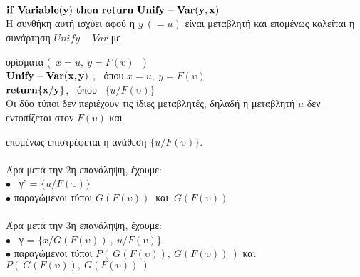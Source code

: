 \documentclass[10pt]{article}
\begin{document}
 \hspace{10mm} $\bf if \ Variable(y) \ then \ return \ Unify-Var(y,x)$\\

\hspace{10mm} Η συνθήκη αυτή ισχύει αφού η $y \ (=u)$ είναι μεταβλητή και επομένως καλείται η συνάρτηση $Unify-Var$ με

\hspace{10mm} ορίσματα (\ $x=u, \  y=F(\text{υ})$ \ ) \\ 

\hspace{10mm} $\bf Unify-Var(x,y)$ , \ όπου  $x = u , \  y = F(\text{υ})$ \\

\hspace{10mm} $ \bf return \{x/y\}$, \ όπου \  $\{u/ F(\text{υ})\}$ \\ 

\hspace{10mm} Οι δύο τύποι δεν περιέχουν τις ίδιες μεταβλητές, δηλαδή η μεταβλητή $u$ δεν εντοπίζεται στον  $F(\text{υ})$ και 

\hspace{10mm} επομένως επιστρέφεται η ανάθεση $\{u/ F(\text{υ})\}$. \\ \\

\hspace{7mm} Άρα μετά την 2η επανάληψη, έχουμε: \\

\hspace{7mm} $\bullet$ \ γ' = $\{u/ F(\text{υ})\}$ \\

\hspace{7mm} $\bullet$ παραγώμενοι τύποι $ G(F(\text{υ})) \ $ και $ \ G(F(\text{υ}))$ \\ \\

\hspace{3mm} Άρα μετά την 3η επανάληψη, έχουμε: \\

\hspace{3mm} $\bullet$ \ γ = $\{x/ G(F(\text{υ})) \ , \ u/ F(\text{υ})\}$ \\

\hspace{3mm} $\bullet$ παραγώμενοι τύποι $P( \ G(F(\text{υ})), \ G(F(\text{υ})) \ )$ και $P( \ G(F(\text{υ})), \ G(F(\text{υ})) \ )$ \\ \\
\end{document}
